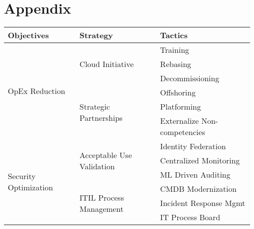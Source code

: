 \documentclass[stu]{apa7}
\begin{document}
\section*{Appendix}
\label{sec:org2f78608}
\noindent\begin{minipage}{\linewidth}
\centering

\centering
\begin{tabular}{l|l|l}
\textbf{Objectives}                    & \textbf{Strategy}                          & \textbf{Tactics}              \\
\hline\hline
\multirow{6}{*}{OpEx Reduction}        & \multirow{3}{*}{Cloud Initiative}          & Training                      \\
&                                            & Rebasing                      \\
&                                            & Decommissioning               \\
\cline{2-3}
& \multirow{3}{*}{Strategic Partnerships}    & Offshoring                    \\
&                                            & Platforming                   \\
&                                            & Externalize Non-competencies  \\
\hline
\multirow{6}{*}{Security Optimization} & \multirow{3}{*}{Acceptable Use Validation} & Identity Federation           \\
&                                            & Centralized Monitoring        \\
&                                            & ML Driven Auditing            \\
\cline{2-3}
& \multirow{3}{*}{ITIL Process Management}   & CMDB Modernization            \\
&                                            & Incident Response Mgmt        \\
&                                            & IT Process Board              \\
\hline\hline
\end{tabular}
\end{minipage}
\end{document}
